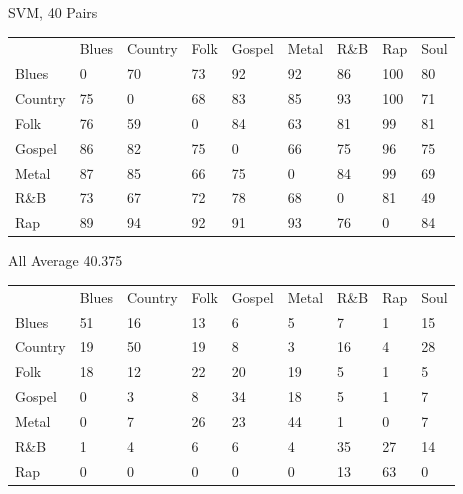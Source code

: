 \documentclass[a4paper,oneside]{article}
\begin{document}
SVM, 40
Pairs
\begin{table}
\begin{tabular}{|l||*{8}{l|}} \hline
 & Blues & Country & Folk & Gospel & Metal & R\&B & Rap & Soul \\ \hhline{|=||*{8}{=|}}
Blues & 0 & 70 & 73 & 92 & 92 & 86 & 100 & 80 \\ \hline
Country & 75 & 0 & 68 & 83 & 85 & 93 & 100 & 71 \\ \hline
Folk & 76 & 59 & 0 & 84 & 63 & 81 & 99 & 81 \\ \hline
Gospel & 86 & 82 & 75 & 0 & 66 & 75 & 96 & 75 \\ \hline
Metal & 87 & 85 & 66 & 75 & 0 & 84 & 99 & 69 \\ \hline
R\&B & 73 & 67 & 72 & 78 & 68 & 0 & 81 & 49 \\ \hline
Rap & 89 & 94 & 92 & 91 & 93 & 76 & 0 & 84 \\ \hline
\end{tabular}
\end{table}

All
Average 40.375
\begin{table}
\begin{tabular}{|l||*{8}{l|}} \hline
 & Blues & Country & Folk & Gospel & Metal & R\&B & Rap & Soul \\ \hhline{|=||*{8}{=|}}
Blues & 51 & 16 & 13 & 6 & 5 & 7 & 1 & 15 \\ \hline
Country & 19 & 50 & 19 & 8 & 3 & 16 & 4 & 28 \\ \hline
Folk & 18 & 12 & 22 & 20 & 19 & 5 & 1 & 5 \\ \hline
Gospel & 0 & 3 & 8 & 34 & 18 & 5 & 1 & 7 \\ \hline
Metal & 0 & 7 & 26 & 23 & 44 & 1 & 0 & 7 \\ \hline
R\&B & 1 & 4 & 6 & 6 & 4 & 35 & 27 & 14 \\ \hline
Rap & 0 & 0 & 0 & 0 & 0 & 13 & 63 & 0 \\ \hline
\end{tabular}
\end{table}
\end{document}

